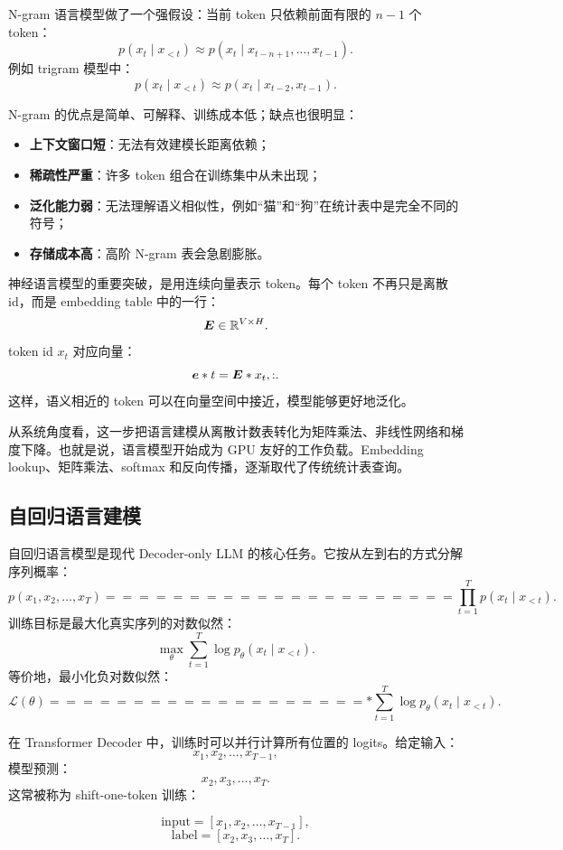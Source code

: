 N-gram 语言模型做了一个强假设：当前 token 只依赖前面有限的 $n-1$ 个 token：
\[
p(x_t\mid x_{<t})
\approx
p(x_t\mid x_{t-n+1},\ldots,x_{t-1}).
\]
例如 trigram 模型中：
\[
p(x_t\mid x_{<t})
\approx
p(x_t\mid x_{t-2},x_{t-1}).
\]

N-gram 的优点是简单、可解释、训练成本低；缺点也很明显：

\begin{itemize}
\item \textbf{上下文窗口短}：无法有效建模长距离依赖；
\item \textbf{稀疏性严重}：许多 token 组合在训练集中从未出现；
\item \textbf{泛化能力弱}：无法理解语义相似性，例如“猫”和“狗”在统计表中是完全不同的符号；
\item \textbf{存储成本高}：高阶 N-gram 表会急剧膨胀。
\end{itemize}

神经语言模型的重要突破，是用连续向量表示 token。每个 token 不再只是离散 id，而是 embedding table 中的一行：
\[
\bm{E}\in\mathbb{R}^{V\times H}.
\]
token id $x_t$ 对应向量：
\[
\bm{e}*t=\bm{E}*{x_t,:}.
\]
这样，语义相近的 token 可以在向量空间中接近，模型能够更好地泛化。

从系统角度看，这一步把语言建模从离散计数表转化为矩阵乘法、非线性网络和梯度下降。也就是说，语言模型开始成为 GPU 友好的工作负载。Embedding lookup、矩阵乘法、softmax 和反向传播，逐渐取代了传统统计表查询。

\subsection{自回归语言建模}
\label{subsec:autoregressive-language-modeling}

自回归语言模型是现代 Decoder-only LLM 的核心任务。它按从左到右的方式分解序列概率：
\[
p(x_1,x_2,\ldots,x_T)
=====================

\prod_{t=1}^{T}
p(x_t\mid x_{<t}).
\]
训练目标是最大化真实序列的对数似然：
\[
\max_{\theta}
\sum_{t=1}^{T}
\log p_{\theta}(x_t\mid x_{<t}).
\]
等价地，最小化负对数似然：
\[
\mathcal{L}(\theta)
===================

*

\sum_{t=1}^{T}
\log p_{\theta}(x_t\mid x_{<t}).
\]

在 Transformer Decoder 中，训练时可以并行计算所有位置的 logits。给定输入：
\[
x_1,x_2,\ldots,x_{T-1},
\]
模型预测：
\[
x_2,x_3,\ldots,x_T.
\]
这常被称为 shift-one-token 训练：

\[
\text{input}=[x_1,x_2,\ldots,x_{T-1}],
\]
\[
\text{label}=[x_2,x_3,\ldots,x_T].
\]

